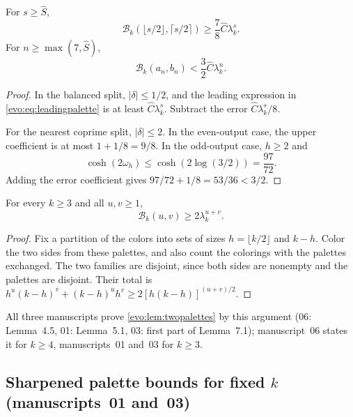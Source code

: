 \documentclass[11pt,a4paper]{article}
\numberwithin{equation}{section}
\theoremstyle{definition}
\theoremstyle{remark}
\newcommand{\Bip}{\mathcal B}
\begin{document}
\begin{corollary}[Manuscript~06]\label{evo:cor:uniformpalette}
For $s\ge\hat S$,
\begin{equation}\label{evo:eq:balancedlower}
 \Bip_k(\lfloor s/2\rfloor,\lceil s/2\rceil)\ge\frac78\hat C\lambda_k^s.
\end{equation}
For $n\ge\max(7,\hat S)$,
\begin{equation}\label{evo:eq:nearupper}
 \Bip_k(a_n,b_n)<\frac32\hat C\lambda_k^n.
\end{equation}
\end{corollary}
\begin{proof}
In the balanced split, $|\delta|\le1/2$, and the leading expression in
\eqref{evo:eq:leadingpalette} is at least $\hat C\lambda_k^s$. Subtract the
error $\hat C\lambda_k^s/8$.

For the nearest coprime split, $|\delta|\le2$. In the even-output case, the
upper coefficient is at most $1+1/8=9/8$. In the odd-output case, $h\ge2$ and
\[
 \cosh(2\omega_h)\le\cosh(2\log(3/2))=\frac{97}{72}.
\]
Adding the error coefficient gives $97/72+1/8=53/36<3/2$.
\end{proof}

\begin{lemma}\label{evo:lem:twopalettes}
For every $k\ge3$ and all $u,v\ge1$,
\begin{equation}\label{evo:eq:twopalettes}
 \Bip_k(u,v)\ge2\lambda_k^{u+v}.
\end{equation}
\end{lemma}
\begin{proof}
Fix a partition of the colors into sets of sizes $h=\lfloor k/2\rfloor$ and
$k-h$. Color the two sides from these palettes, and also count the colorings
with the palettes exchanged. The two families are disjoint, since both sides
are nonempty and the palettes are disjoint. Their total is
$h^u(k-h)^v+(k-h)^uh^v\ge2[h(k-h)]^{(u+v)/2}$.
\end{proof}

All three manuscripts prove \cref{evo:lem:twopalettes} by this argument
(06: Lemma~4.5, 01: Lemma~5.1, 03: first part of Lemma~7.1); manuscript~06
states it for $k\ge4$, manuscripts~01 and~03 for $k\ge3$.

\subsection{Sharpened palette bounds for fixed $k$ (manuscripts~01 and~03)}
\end{document}
